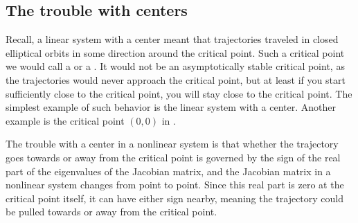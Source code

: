 \documentclass[12pt]{book}
\begin{document}
\subsection{The trouble with centers}

Recall, a linear system with a center meant that trajectories
traveled in closed elliptical orbits
in some direction around the critical point.  Such
a critical point we would call a \emph{} or
a \emph{}.  It would not be an asymptotically 
stable critical point, as the trajectories would never approach the critical
point, but at least if you start sufficiently close to the critical point,
you will stay close to the critical point.  The simplest example of such
behavior is the linear system with a center.  Another
example is the critical point $(0,0)$ in
.

The trouble with a center in a nonlinear system is that whether the
trajectory goes towards or away from the critical point is governed by the
sign of the real part of the eigenvalues of the Jacobian matrix, and the Jacobian
matrix
in a nonlinear system changes from point to point.  Since this real
part is zero at the critical point itself, it can have either sign nearby,
meaning the trajectory could be pulled towards or away from the critical
point.
\end{document}
